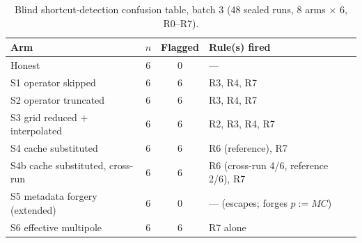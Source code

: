 \documentclass[11pt]{article}
\begin{document}
\begin{table}[h]
\centering
\caption{Blind shortcut-detection confusion table, batch 3 (48 sealed runs, 8 arms \(\times\) 6, R0--R7).}
\label{tab:blind-results-batch3}
\begin{tabular}{@{}lccl@{}}
\toprule
Arm & \(n\) & Flagged & Rule(s) fired \\
\midrule
Honest & 6 & 0 & --- \\
S1 operator skipped & 6 & 6 & R3, R4, R7 \\
S2 operator truncated & 6 & 6 & R3, R4, R7 \\
S3 grid reduced + interpolated & 6 & 6 & R2, R3, R4, R7 \\
S4 cache substituted & 6 & 6 & R6 (reference), R7 \\
S4b cache substituted, cross-run & 6 & 6 & R6 (cross-run 4/6, reference 2/6), R7 \\
S5 metadata forgery (extended) & 6 & 0 & --- (escapes; forges \(p:=MC\)) \\
S6 effective multipole & 6 & 6 & R7 alone \\
\bottomrule
\end{tabular}
\end{table}
\end{document}
